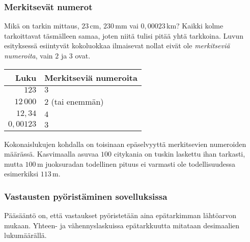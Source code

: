 
\subsubsection*{Merkitsevät numerot}

Mikä on tarkin mittaus, $23$\,cm, $230$\,mm vai $0,00023$\,km? Kaikki kolme tarkoittavat täsmälleen samaa, joten niitä tulisi pitää yhtä tarkkoina. Luvun esityksessä esiintyvät kokoluokkaa ilmaisevat nollat eivät ole \emph{merkitseviä numeroita}, vain $2$ ja $3$ ovat.


\begin{center}
\begin{tabular}{r|l}
Luku & Merkitseviä numeroita \\
\hline
$123$ & $3$ \\
$12\,000$ & $2$ (tai enemmän)\\
$12,34$ & $4$ \\
$0,00123$ & $3$
\end{tabular}
\end{center} %


Kokonaislukujen kohdalla on toisinaan epäselvyyttä merkitsevien numeroiden määrässä. Kasvimaalla asuvaa $100$ citykania on tuskin laskettu ihan tarkasti, mutta $100$\,m juoksuradan todellinen pituus ei varmasti ole todellisuudessa esimerkiksi $113$\,m.

\subsubsection*{Vastausten pyöristäminen sovelluksissa}

Pääsääntö on, että vastaukset pyöristetään aina epätarkimman lähtöarvon mukaan. Yhteen- ja vähennyslaskuissa epätarkkuutta mitataan desimaalien lukumäärällä.

